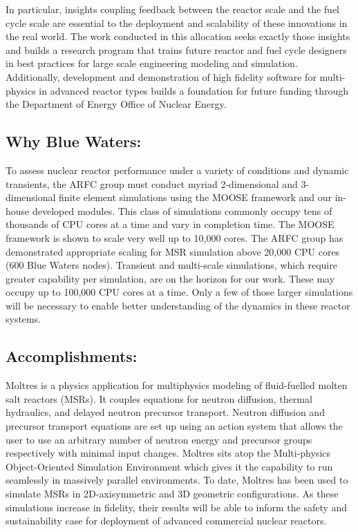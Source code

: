 \documentclass[letterpaper]{article}
\begin{document}
In particular, insights coupling feedback between the reactor scale and the
fuel cycle scale are essential to the deployment and scalability of these
innovations in the real world. The work conducted in this allocation seeks
exactly those insights and builds a research program that trains future
reactor and fuel cycle designers in best practices for large scale engineering 
modeling and simulation. Additionally, development and demonstration
of high fidelity software for multi-physics in advanced reactor types builds a
foundation for future funding through the Department of Energy Office of
Nuclear Energy. 


\subsection{Why Blue Waters:} To assess nuclear reactor performance under a
variety of conditions and dynamic transients, the ARFC group must conduct
myriad 2-dimensional and 3-dimensional finite element simulations using the
MOOSE framework and our in-house developed modules. This class of simulations commonly
occupy tens of thousands of CPU cores at a time and vary in completion time.
The MOOSE framework is shown to scale very well up to 10,000 cores. The ARFC
group has demonstrated appropriate scaling for MSR simulation above 20,000 CPU
cores (600 Blue Waters nodes). Transient and multi-scale simulations, which
require greater capability per simulation, are on the horizon for our work.
These may occupy up to 100,000 CPU cores at a time. Only a few of those larger
simulations will be necessary to enable better understanding of the dynamics in
these reactor systems.

\subsection{Accomplishments:} 
Moltres \cite{lindsay_moltres_2016} is
a physics application for multiphysics modeling of fluid-fuelled molten salt
reactors (MSRs). It couples equations for neutron diffusion, thermal
hydraulics, and delayed neutron precursor transport. Neutron diffusion and
precursor transport equations are set up using an action system that allows the
user to use an arbitrary number of neutron energy and precursor groups
respectively with minimal input changes. Moltres sits atop the Multi-physics
Object-Oriented Simulation Environment \cite{gaston_moose_2010} which gives it the
capability to run seamlessly in massively parallel environments. To date,
Moltres has been used to simulate MSRs in 2D-axisymmetric and 3D geometric
configurations. As these simulations increase in fidelity, their results will
be able to inform the safety and sustainability case for deployment of advanced
commercial nuclear reactors.
\end{document}
